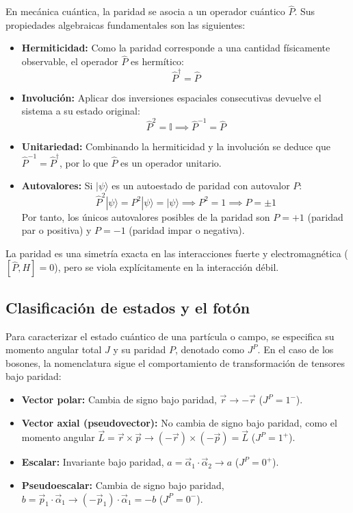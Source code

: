 En mecánica cuántica, la paridad se asocia a un operador cuántico $\hat{P}$. Sus propiedades algebraicas fundamentales son las siguientes:
\begin{itemize}
    \item \textbf{Hermiticidad:} Como la paridad corresponde a una cantidad físicamente observable, el operador $\hat{P}$ es hermítico:
    \begin{equation}
        \hat{P}^\dagger = \hat{P}
    \end{equation}
    \item \textbf{Involución:} Aplicar dos inversiones espaciales consecutivas devuelve el sistema a su estado original:
    \begin{equation}
        \hat{P}^2 = \mathbb{I} \implies \hat{P}^{-1} = \hat{P}
    \end{equation}
    \item \textbf{Unitariedad:} Combinando la hermiticidad y la involución se deduce que $\hat{P}^{-1} = \hat{P}^\dagger$, por lo que $\hat{P}$ es un operador unitario.
    \item \textbf{Autovalores:} Si $|\psi\rangle$ es un autoestado de paridad con autovalor $P$:
    \begin{equation}
        \hat{P}^2 |\psi\rangle = P^2 |\psi\rangle = |\psi\rangle \implies P^2 = 1 \implies P = \pm 1
    \end{equation}
    Por tanto, los únicos autovalores posibles de la paridad son $P = +1$ (paridad par o positiva) y $P = -1$ (paridad impar o negativa).
\end{itemize}

La paridad es una simetría exacta en las interacciones fuerte y electromagnética ($[\hat{P}, H] = 0$), pero se viola explícitamente en la interacción débil.

\subsection{Clasificación de estados y el fotón}

Para caracterizar el estado cuántico de una partícula o campo, se especifica su momento angular total $J$ y su paridad $P$, denotado como $J^P$. En el caso de los bosones, la nomenclatura sigue el comportamiento de transformación de tensores bajo paridad:
\begin{itemize}
    \item \textbf{Vector polar:} Cambia de signo bajo paridad, $\vec{r} \to -\vec{r}$ ($J^P = 1^-$).
    \item \textbf{Vector axial (pseudovector):} No cambia de signo bajo paridad, como el momento angular $\vec{L} = \vec{r} \times \vec{p} \to (-\vec{r}) \times (-\vec{p}) = \vec{L}$ ($J^P = 1^+$).
    \item \textbf{Escalar:} Invariante bajo paridad, $a = \vec{\alpha}_1 \cdot \vec{\alpha}_2 \to a$ ($J^P = 0^+$).
    \item \textbf{Pseudoescalar:} Cambia de signo bajo paridad, $b = \vec{p}_1 \cdot \vec{\alpha}_1 \to (- \vec{p}_1) \cdot \vec{\alpha}_1 = -b$ ($J^P = 0^-$).
\end{itemize}

